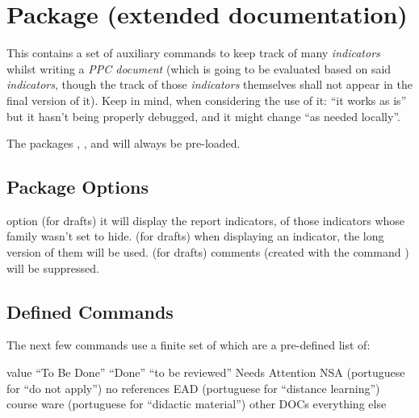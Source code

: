 \documentclass[article,nogeometry,english,tocdepth=3,secdepth=3]{ufrgscca} %
\begin{document}
\section{ Package (extended documentation)}
This contains a set of auxiliary commands to keep track of many \emph{indicators} whilst writing  a \emph{PPC document} (which is going to be evaluated based on said \emph{indicators}, though the track of those \emph{indicators} themselves shall not appear in the final version of it). Keep in mind, when considering the use of it: “it works as is” but it hasn't being properly debugged, and it might change “as needed locally”.

The packages , ,  and  will always be pre-loaded.

\subsection{Package Options}
\begin{describelist}{option}
 { (for drafts) it will display the report indicators, of those indicators whose family wasn't set to hide.}
 { (for drafts) when displaying an indicator, the long version of them will be used.}
 { (for drafts) comments (created with the command \tsmacro{\comment}) will be suppressed.}
\end{describelist}

\subsection{Defined Commands}

The next few commands use a finite set of  which are a pre-defined list of:
\begin{describelist*}{value}
     { “To Be Done”}
     { “Done”}
     { “to be reviewed”}
     { Needs Attention}
     { NSA (portuguese for “do not apply”)}
     { no references}
     { EAD (portuguese for “distance learning”)}
     { course ware (portuguese for “didactic material”) }
     { other DOCs}
     { everything else}
\end{describelist*}
\end{document}
